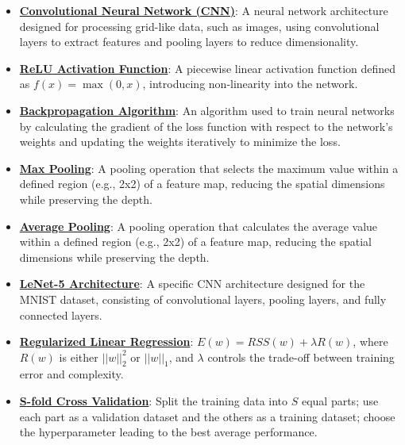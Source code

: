 \documentclass{article}%
\begin{document}
\begin{itemize}[leftmargin=*]%
\item \href{https://www.math.purdue.edu/~yipn/351/09L1-cnn.pdf#page=2}{\textbf{Convolutional Neural Network (CNN)}}: A neural network architecture designed for processing grid-like data, such as images, using convolutional layers to extract features and pooling layers to reduce dimensionality.%
\item \href{https://www.math.purdue.edu/~yipn/351/09L1-cnn.pdf#page=13}{\textbf{ReLU Activation Function}}: A piecewise linear activation function defined as $f(x) = \max(0, x)$, introducing non-linearity into the network.%
\item \href{https://www.math.purdue.edu/~yipn/351/09L1-cnn.pdf#page=16}{\textbf{Backpropagation Algorithm}}: An algorithm used to train neural networks by calculating the gradient of the loss function with respect to the network's weights and updating the weights iteratively to minimize the loss.%
\item \href{https://www.math.purdue.edu/~yipn/351/09L1-cnn.pdf#page=14}{\textbf{Max Pooling}}: A pooling operation that selects the maximum value within a defined region (e.g., 2x2) of a feature map, reducing the spatial dimensions while preserving the depth.%
\item \href{https://www.math.purdue.edu/~yipn/351/09L1-cnn.pdf#page=15}{\textbf{Average Pooling}}: A pooling operation that calculates the average value within a defined region (e.g., 2x2) of a feature map, reducing the spatial dimensions while preserving the depth.%
\item \href{https://www.math.purdue.edu/~yipn/351/09L1-cnn.pdf#page=22}{\textbf{LeNet{-}5 Architecture}}: A specific CNN architecture designed for the MNIST dataset, consisting of convolutional layers, pooling layers, and fully connected layers.%
\end{itemize}%
\begin{itemize}[leftmargin=*]%
\item \href{https://www.math.purdue.edu/~yipn/351/10L1-CrossValidation.pdf#page=17}{\textbf{Regularized Linear Regression}}: $E(w) = RSS(w) + \lambda R(w)$, where $R(w)$ is either $||w||_2^2$ or $||w||_1$, and $\lambda$ controls the trade-off between training error and complexity.%
\item \href{https://www.math.purdue.edu/~yipn/351/10L1-CrossValidation.pdf#page=25}{\textbf{S{-}fold Cross Validation}}: Split the training data into $S$ equal parts; use each part as a validation dataset and the others as a training dataset; choose the hyperparameter leading to the best average performance.%
\end{itemize}%
\end{document}
